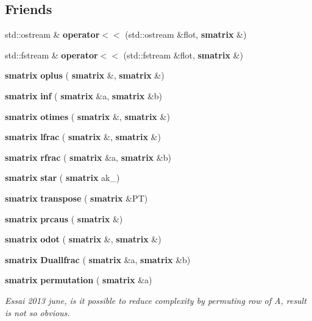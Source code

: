 \subsection*{Friends}
\begin{DoxyCompactItemize}
\item 
\mbox{\label{classmmgd_1_1smatrix_a80b563f2b73edca16f999406823a00ca}} 
std\+::ostream \& {\bfseries operator$<$$<$} (std\+::ostream \&flot, \textbf{ smatrix} \&)
\item 
\mbox{\label{classmmgd_1_1smatrix_a1375ad453276ed1ec5fdb725ac7529d3}} 
std\+::fstream \& {\bfseries operator$<$$<$} (std\+::fstream \&flot, \textbf{ smatrix} \&)
\item 
\mbox{\label{classmmgd_1_1smatrix_a2712266a3daac8104391e94b9fb4bcd5}} 
\textbf{ smatrix} {\bfseries oplus} (\textbf{ smatrix} \&, \textbf{ smatrix} \&)
\item 
\mbox{\label{classmmgd_1_1smatrix_a467f151d39c1d0d2923c8f1b744aae34}} 
\textbf{ smatrix} {\bfseries inf} (\textbf{ smatrix} \&a, \textbf{ smatrix} \&b)
\item 
\mbox{\label{classmmgd_1_1smatrix_a403dbecf9e562ab8bf8f3855e5f87a46}} 
\textbf{ smatrix} {\bfseries otimes} (\textbf{ smatrix} \&, \textbf{ smatrix} \&)
\item 
\mbox{\label{classmmgd_1_1smatrix_a1f8eedf92afd6dd3ef436be30313d31a}} 
\textbf{ smatrix} {\bfseries lfrac} (\textbf{ smatrix} \&, \textbf{ smatrix} \&)
\item 
\mbox{\label{classmmgd_1_1smatrix_af16ff70963afe9afa40f3d91f1dee8f0}} 
\textbf{ smatrix} {\bfseries rfrac} (\textbf{ smatrix} \&a, \textbf{ smatrix} \&b)
\item 
\mbox{\label{classmmgd_1_1smatrix_a4f23029e8be26fdbc0820b684fe37773}} 
\textbf{ smatrix} {\bfseries star} (\textbf{ smatrix} ak\+\_)
\item 
\mbox{\label{classmmgd_1_1smatrix_a6e09e26c5ea56b1ac7c5934fe818b671}} 
\textbf{ smatrix} {\bfseries transpose} (\textbf{ smatrix} \&PT)
\item 
\mbox{\label{classmmgd_1_1smatrix_ac1992388f90f520f2884143d0e1a9eaf}} 
\textbf{ smatrix} {\bfseries prcaus} (\textbf{ smatrix} \&)
\item 
\mbox{\label{classmmgd_1_1smatrix_a693facf246e734141a0c83e4c7481104}} 
\textbf{ smatrix} {\bfseries odot} (\textbf{ smatrix} \&, \textbf{ smatrix} \&)
\item 
\mbox{\label{classmmgd_1_1smatrix_af4fb085f2ff98fd96f1b107519f44b2d}} 
\textbf{ smatrix} {\bfseries Duallfrac} (\textbf{ smatrix} \&a, \textbf{ smatrix} \&b)
\item 
\mbox{\label{classmmgd_1_1smatrix_a3c2d52ccdc78baa68b362f2c26a5890a}} 
\textbf{ smatrix} \textbf{ permutation} (\textbf{ smatrix} \&a)
\begin{DoxyCompactList}\small\item\em Essai 2013 june, is it possible to reduce complexity by permuting row of A, result is not so obvious. \end{DoxyCompactList}\end{DoxyCompactItemize}


